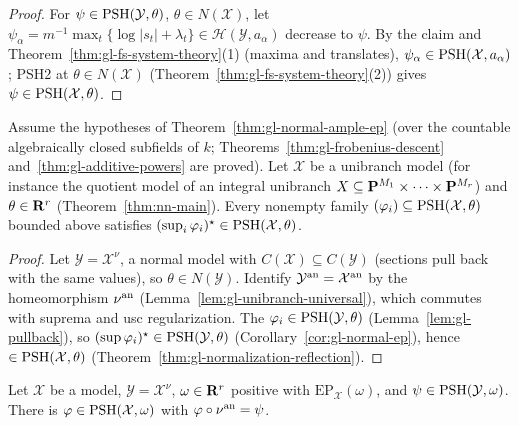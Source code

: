 \begin{proof}
For $\psi\in\operatorname{PSH}(\mathcal Y,\theta)$, $\theta\in N(\mathcal X)$, let $\psi_\alpha=m^{-1}\max_t\{\log|s_t|+\lambda_t\}\in\mathcal H(\mathcal Y,a_\alpha)$ decrease to $\psi$. By the claim
and Theorem~\ref{thm:gl-fs-system-theory}(1) (maxima and translates), $\psi_\alpha\in\operatorname{PSH}(\mathcal X,a_\alpha)$; PSH2 at $\theta\in N(\mathcal X)$
(Theorem~\ref{thm:gl-fs-system-theory}(2)) gives $\psi\in\operatorname{PSH}(\mathcal X,\theta)$.
\end{proof}

\begin{theorem}\label{thm:gl-main}
\leanok
{}
Assume the hypotheses of Theorem~\ref{thm:gl-normal-ample-ep} (over the countable algebraically closed subfields of $k$; Theorems~\ref{thm:gl-frobenius-descent} and~\ref{thm:gl-additive-powers} are proved). Let $\mathcal X$ be a unibranch model (for instance the quotient model of an integral unibranch
$X\subseteq\mathbf{P}^{M_1}\times\dots\times\mathbf{P}^{M_r}$) and $\theta\in\mathbf{R}^r$ (Theorem~\ref{thm:nn-main}). Every nonempty family $(\varphi_i)\subseteq\operatorname{PSH}(\mathcal X,\theta)$ bounded above
satisfies $(\sup_i\varphi_i)^\star\in\operatorname{PSH}(\mathcal X,\theta)$.
\end{theorem}

\begin{proof}
Let $\mathcal Y=\mathcal X^\nu$, a normal model with $C(\mathcal X)\subseteq C(\mathcal Y)$ (sections pull back with the same values), so $\theta\in N(\mathcal Y)$. Identify
$\mathcal Y^{\mathrm{an}}=\mathcal X^{\mathrm{an}}$ by the homeomorphism $\nu^{\mathrm{an}}$ (Lemma~\ref{lem:gl-unibranch-universal}), which commutes with suprema and usc regularization. The
$\varphi_i\in\operatorname{PSH}(\mathcal Y,\theta)$ (Lemma~\ref{lem:gl-pullback}), so $(\sup\varphi_i)^\star\in\operatorname{PSH}(\mathcal Y,\theta)$ (Corollary~\ref{cor:gl-normal-ep}), hence
$\in\operatorname{PSH}(\mathcal X,\theta)$ (Theorem~\ref{thm:gl-normalization-reflection}).
\end{proof}

\begin{proposition}\label{prop:gl-conductor-descent}
\leanok
{}
Let $\mathcal X$ be a model, $\mathcal Y=\mathcal X^\nu$, $\omega\in\mathbf{R}^r$ positive with $\mathrm{EP}_{\mathcal X}(\omega)$, and $\psi\in\operatorname{PSH}(\mathcal Y,\omega)$. There is
$\varphi\in\operatorname{PSH}(\mathcal X,\omega)$ with $\varphi\circ\nu^{\mathrm{an}}=\psi$.
\end{proposition}

